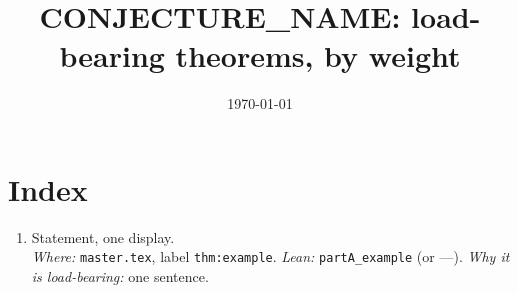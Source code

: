\documentclass[11pt]{article}
\title{ {{CONJECTURE_NAME}}: load-bearing theorems, by weight}
\date{\today}
\begin{document}
\maketitle

\section*{Index}

\begin{enumerate}
  \item {{Statement, one display.}} \\
        \emph{Where:} \texttt{master.tex}, label \texttt{thm:example}.
        \emph{Lean:} \texttt{partA\_example} (or ---).
        \emph{Why it is load-bearing:} {{one sentence.}}
\end{enumerate}
\end{document}

